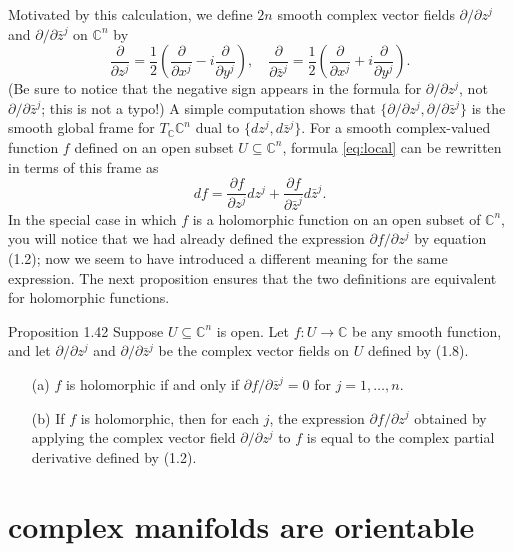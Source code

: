 Motivated by this calculation, we define $2n$ smooth complex vector fields $\partial/\partial z^j$ and $\partial/\partial \bar{z}^j$ on $\mathbb{C}^n$ by
\begin{equation*}
\frac{\partial}{\partial z^j} = \frac{1}{2}\left(\frac{\partial}{\partial x^j} - i\frac{\partial}{\partial y^j}\right), \quad
\frac{\partial}{\partial \bar{z}^j} = \frac{1}{2}\left(\frac{\partial}{\partial x^j} + i\frac{\partial}{\partial y^j}\right).
\end{equation*}
(Be sure to notice that the negative sign appears in the formula for $\partial/\partial z^j$, not $\partial/\partial \bar{z}^j$; this is not a typo!) A simple computation shows that $\{\partial/\partial z^j, \partial/\partial \bar{z}^j\}$ is the smooth global frame for $T_\mathbb{C}\mathbb{C}^n$ dual to $\{dz^j, d\bar{z}^j\}$. For a smooth complex-valued function $f$ defined on an open subset $U \subseteq \mathbb{C}^n$, formula \cref{eq:local} can be rewritten in terms of this frame as
\begin{equation*}
  df = \frac{\partial f}{\partial z^j} dz^j + \frac{\partial f}{\partial \bar{z}^j} d\bar{z}^j.
\end{equation*}
In the special case in which $f$ is a holomorphic function on an open subset of $\mathbb{C}^n$, you will notice that we had already defined the expression $\partial f/\partial z^j$ by equation (1.2); now we seem to have introduced a different meaning for the same expression. The next proposition ensures that the two definitions are equivalent for holomorphic functions.

\begin{thing4}{Proposition 1.42}\label{prop:1.42}\leavevmode
Suppose $U \subseteq \mathbb{C}^n$ is open. Let $f : U \to \mathbb{C}$ be any smooth function, and let $\partial/\partial z^j$ and $\partial/\partial \bar{z}^j$ be the complex vector fields on $U$ defined by (1.8).
\begin{itemize}
    \item[(a)] $f$ is holomorphic if and only if $\partial f/\partial \bar{z}^j = 0$ for $j = 1, \dots, n$.
    \item[(b)] If $f$ is holomorphic, then for each $j$, the expression $\partial f/\partial z^j$ obtained by applying the complex vector field $\partial/\partial z^j$ to $f$ is equal to the complex partial derivative defined by (1.2).
\end{itemize}
\end{thing4}

\section{complex manifolds are orientable}

